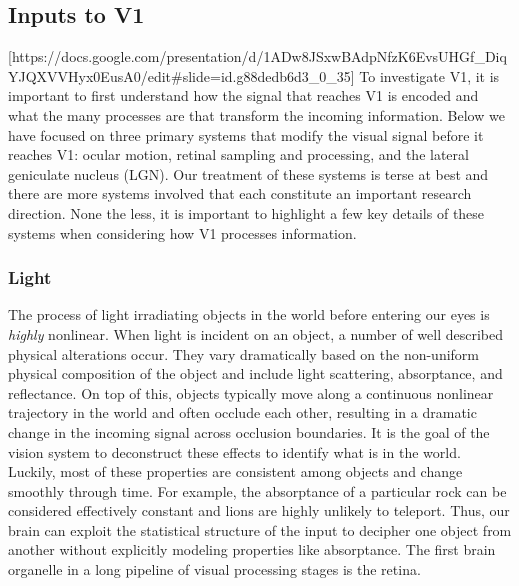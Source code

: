 \subsection{Inputs to V1}
[https://docs.google.com/presentation/d/1ADw8JSxwBAdpNfzK6EvsUHGf_DiqYJQXVVHyx0EusA0/edit#slide=id.g88dedb6d3_0_35]
To investigate V1, it is important to first understand how the signal that reaches V1 is encoded and what the many processes are that transform the incoming information. Below we have focused on three primary systems that modify the visual signal before it reaches V1: ocular motion, retinal sampling and processing, and the lateral geniculate nucleus (LGN). Our treatment of these systems is terse at best and there are more systems involved that each constitute an important research direction. None the less, it is important to highlight a few key details of these systems when considering how V1 processes information.

\subsubsection{Light} The process of light irradiating objects in the world before entering our eyes is \textit{highly} nonlinear. When light is incident on an object, a number of well described physical alterations occur. They vary dramatically based on the non-uniform physical composition of the object and include light scattering, absorptance, and reflectance. On top of this, objects typically move along a continuous nonlinear trajectory in the world and often occlude each other, resulting in a dramatic change in the incoming signal across occlusion boundaries. It is the goal of the vision system to deconstruct these effects to identify what is in the world. Luckily, most of these properties are consistent among objects and change smoothly through time. For example, the absorptance of a particular rock can be considered effectively constant and lions are highly unlikely to teleport. Thus, our brain can exploit the statistical structure of the input to decipher one object from another without explicitly modeling properties like absorptance. The first brain organelle in a long pipeline of visual processing stages is the retina.

